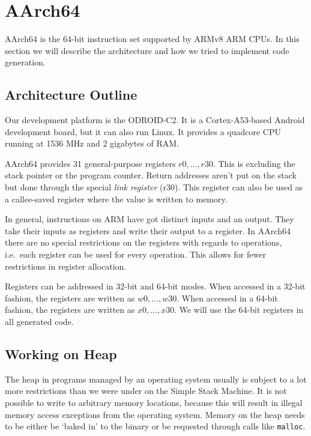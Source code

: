 \chapter{AArch64}

AArch64 is the 64-bit instruction set supported by ARMv8 ARM CPUs.
In this section we will describe the architecture and how we tried to implement code generation.


\section{Architecture Outline}

Our development platform is the ODROID-C2.
It is a Cortex-A53-based Android development board, but it can also run Linux.
It provides a quadcore CPU running at 1536 MHz and 2 gigabytes of RAM\@.

AArch64 provides 31 general-purpose registers $r0, \ldots, r30$.
This is excluding the stack pointer or the program counter.
Return addresses aren't put on the stack but done through the special \emph{link register} (r30).
This register can also be used as a callee-saved register where the value is written to memory.

In general, instructions on ARM have got distinct inputs and an output.
They take their inputs as registers and write their output to a register.
In AArch64 there are no special restrictions on the registers with regards to operations, i.e.\ each register can be used for every operation.
This allows for fewer restrictions in register allocation.

Registers can be addressed in 32-bit and 64-bit modes.
When accessed in a 32-bit fashion, the registers are written as $w0, \ldots, w30$.
When accessed in a 64-bit fashion, the registers are written as $x0, \ldots, x30$.
We will use the 64-bit registers in all generated code.

\section{Working on Heap}

The heap in programs managed by an operating system usually is subject to a lot more restrictions than we were under on the Simple Stack Machine.
It is not possible to write to arbitrary memory locations, because this will result in illegal memory access exceptions from the operating system.
Memory on the heap needs to be either be `baked in' to the binary or be requested through calls like \texttt{malloc}.

